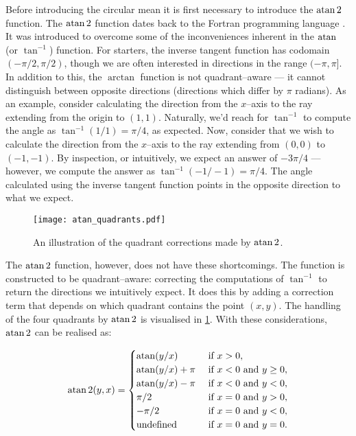 Before introducing the circular mean it is first necessary to introduce the $\atan2$ function. The $\atan2$ function dates back to the Fortran programming language \citep{organick66}. It was introduced to overcome some of the inconveniences inherent in the $\atan$ (or $\tan^{-1}$) function. For starters, the inverse tangent function has codomain $(-\pi/2, \pi/2)$, though we are often interested in directions in the range $(-\pi, \pi]$. In addition to this, the $\arctan$ function is not quadrant--aware --- it cannot distinguish between opposite directions (directions which differ by $\pi$ radians). As an example, consider calculating the direction from the $x$--axis to the ray extending from the origin to $(1, 1)$. Naturally, we'd reach for $\tan^{-1}$ to compute the angle as $\tan^{-1}(1/1) = \pi/4$, as expected. Now, consider that we wish to calculate the direction from the $x$--axis to the ray extending from $(0, 0)$ to $(-1, -1)$. By inspection, or intuitively, we expect an answer of $-3\pi/4$ --- however, we compute the answer as $\tan^{-1}(-1/-1) = \pi/4$. The angle calculated using the inverse tangent function points in the opposite direction to what we expect.

\begin{figure}[!htbp]
	\texttt{[image: atan\_quadrants.pdf]}
	\caption{An illustration of the quadrant corrections made by $\atan2$.}
	\label{fig:atan_quadrants}
\end{figure}

The $\atan2$ function, however, does not have these shortcomings. The function is constructed to be quadrant--aware: correcting the computations of $\tan^{-1}$ to return the directions we intuitively expect. It does this by adding a correction term that depends on which quadrant contains the point $(x, y)$. The handling of the four quadrants by $\atan2$ is visualised in \cref{fig:atan_quadrants}. With these considerations, $\atan2$ can be realised as:

\begin{equation}
\label{eq:atan2}
	\atan2(y, x) = 
	\begin{cases}
		\atan(y/x) & \text{ if } x > 0, \\
		\atan(y/x) + \pi & \text{ if } x < 0 \text{ and } y \geq 0, \\
		\atan(y/x) - \pi & \text{ if } x < 0 \text{ and } y < 0, \\
		\pi/2  & \text{ if } x = 0 \text{ and } y > 0, \\
		- \pi/2 & \text{ if } x = 0 \text{ and } y < 0, \\
		\text{undefined} & \text{ if } x = 0 \text{ and } y = 0. \\
	\end{cases}
\end{equation}

